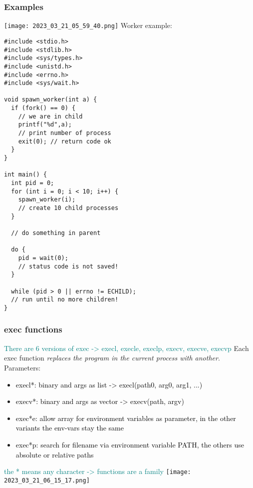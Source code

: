 \documentclass[main.tex,fontsize=8pt,paper=a4,paper=portrait,DIV=calc,]{scrartcl}
\begin{document}
\subsubsection{Examples}
\texttt{[image: 2023\_03\_21\_05\_59\_40.png]}\newline
Worker example:
\begin{lstlisting}
#include <stdio.h>
#include <stdlib.h>
#include <sys/types.h>
#include <unistd.h>
#include <errno.h>
#include <sys/wait.h>

void spawn_worker(int a) {
  if (fork() == 0) {
    // we are in child
    printf("%d",a);
    // print number of process
    exit(0); // return code ok
  }
}

int main() {
  int pid = 0;
  for (int i = 0; i < 10; i++) {
    spawn_worker(i);
    // create 10 child processes
  }

  // do something in parent

  do {
    pid = wait(0);
    // status code is not saved!
  }

  while (pid > 0 || errno != ECHILD);
  // run until no more children!
}
\end{lstlisting}

\subsubsection{exec functions}
\textcolor{teal}{There are 6 versions of exec -> execl, execle, execlp, execv, execve, execvp}\newline
Each exec function \emph{replaces the program in the current process with another}.\newline
Parameters:
\begin{itemize}
\item \textcolor{black}{execl*: binary and args as list -> execl(path0, arg0, arg1, ...)}
\item \textcolor{black}{execv*: binary and args as vector -> execv(path, argv)}
\item \textcolor{black}{exec*e: allow array for environment variables as parameter, in the other variants the env-vars stay the same}
\item \textcolor{black}{exec*p: search for filename via environment variable PATH, the others use absolute or relative paths}
\end{itemize} 
\textcolor{teal}{the * means any character -> functions are a family}\newline
\texttt{[image: 2023\_03\_21\_06\_15\_17.png]}
\end{document}
